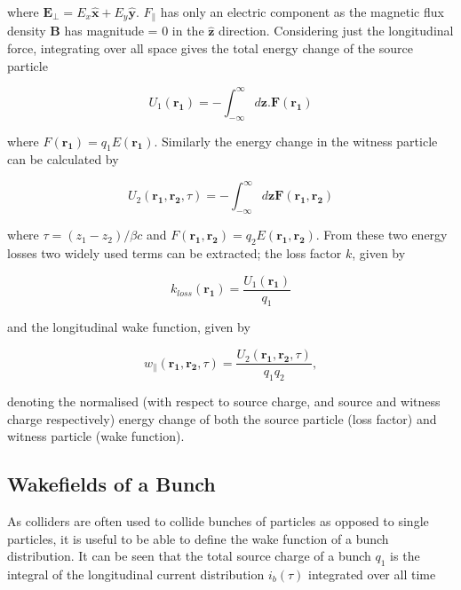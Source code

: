 where $\mathbf{E_{\perp}} = E_{x}\mathbf{\hat{x}} + E_{y}\mathbf{\hat{y}}$. $F_{\parallel}$ has only an electric component as the magnetic flux density $\mathbf{B}$ has magnitude = 0 in the $\mathbf{\hat{z}}$ direction. Considering just the longitudinal force, integrating over all space gives the total energy change of the source particle

\begin{equation}
U_{1}\left(\mathbf{r_{1}}  \right) = - \int^{\infty}_{-\infty} d\mathbf{z} . \mathbf{F}\left(\mathbf{r_{1}}  \right)
\end{equation}

where $F( \mathbf{r_{1}} ) = q_{1} E (\mathbf{r_{1}} )$. Similarly the energy change in the witness particle can be calculated by

\begin{equation}
U_{2}\left(\mathbf{r_{1}}, \mathbf{r_{2}}, \tau  \right)  = - \int^{\infty}_{-\infty} d\mathbf{z} \mathbf{F}\left(\mathbf{r_{1}}, \mathbf{r_{2}}  \right)
\label{eqn:witness_energy_change_single}
\end{equation}

where $\tau = \left( z_{1}-z_{2} \right)/\beta{}c$ and $F( \mathbf{r_{1}}, \mathbf{r_{2}} ) = q_{2} E (\mathbf{r_{1}}, \mathbf{r_{2}} )$. From these two energy losses two widely used terms can be extracted; the loss factor $k$, given by

\begin{equation}
k_{loss}\left(\mathbf{r_{1}}  \right) = \frac{U_{1}\left(\mathbf{r_{1}}  \right)}{q_{1}}
\end{equation}

and the longitudinal wake function, given by

\begin{equation}
w_{\parallel}\left(\mathbf{r_{1}}, \mathbf{r_{2}}, \tau   \right) = \frac{U_{2}\left(\mathbf{r_{1}}, \mathbf{r_{2}}, \tau  \right) }{q_{1} q_{2}},
\label{eqn:long_wake_func}
\end{equation}

denoting the normalised (with respect to source charge, and source and witness charge respectively) energy change of both the source particle (loss factor) and witness particle (wake function). 

\subsection{Wakefields of a Bunch}

As colliders are often used to collide bunches of particles as opposed to single particles, it is useful to be able to define the wake function of a bunch distribution. It can be seen that the total source charge of a bunch $q_{1}$ is the integral of the longitudinal current distribution $i_{b}\left( \tau \right)$ integrated over all time

